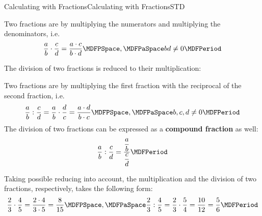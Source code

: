 \begin{MXContent}{Calculating with Fractions}{Calculating with Fractions}{STD}
\begin{MInfo}
Two fractions are  by multiplying the 
numerators and multiplying the denominators, i.e.\
$$\Mdfrac{a}{b} \cdot \Mdfrac{c}{d} = \Mdfrac{a\cdot c}{b\cdot d}\MDFPSpace, \MDFPaSpace b d\neq 0 \MDFPeriod$$
\end{MInfo}

The division of two fractions is reduced to their multiplication:

\begin{MInfo}
Two fractions are  by multiplying the first fraction with the reciprocal of 
the second fraction, i.e. 
$$\Mdfrac{a}{b} : \Mdfrac{c}{d} = \Mdfrac{a}{b} \cdot \Mdfrac{d}{c} = \Mdfrac{a\cdot d}{b\cdot c}\MDFPSpace, \MDFPaSpace b,c,d\neq 0 \MDFPeriod$$
The division of two fractions can be expressed as a \textbf{compound fraction} as well:
$$\Mdfrac{a}{b} : \Mdfrac{c}{d} = \Mdfrac{\Mdfrac{a}{b}}{\Mdfrac{c}{d}} \MDFPeriod$$
\end{MInfo}

\begin{MExample}
Taking possible reducing into account, the multiplication and the division of two fractions, respectively, 
takes the following form:
$$\Mdfrac23\cdot \Mdfrac45 = \Mdfrac{2\cdot 4}{3\cdot 5} = \Mdfrac{8}{15}\MDFPSpace, \MDFPaSpace \Mdfrac23 : \Mdfrac45 = \Mdfrac23\cdot \Mdfrac54 = \Mdfrac{10}{12} = \Mdfrac56 \MDFPeriod$$
\end{MExample}


\end{MXContent}

